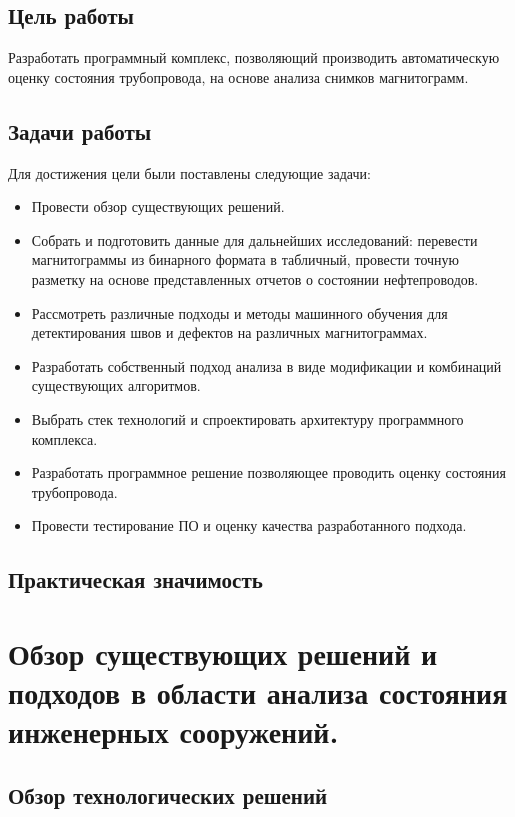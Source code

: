 \documentclass[a4paper,article,14pt]{extarticle}
\begin{document}
\subsection{Цель работы}
Разработать программный комплекс, позволяющий производить автоматическую оценку состояния трубопровода, на основе анализа снимков магнитограмм. 

\subsection{Задачи работы}
Для достижения цели были поставлены следующие задачи:

\begin{itemize}
    \item Провести обзор существующих решений.
    \item Собрать и подготовить данные для дальнейших исследований: перевести магнитограммы из бинарного формата в табличный, 
    провести точную разметку на основе представленных отчетов о состоянии нефтепроводов.
    \item Рассмотреть различные подходы и методы машинного обучения для детектирования швов и дефектов на различных магнитограммах.
    \item Разработать собственный подход анализа в виде модификации и комбинаций существующих алгоритмов.
    \item Выбрать стек технологий и спроектировать архитектуру программного комплекса.
    \item Разработать программное решение позволяющее проводить оценку состояния трубопровода.
    \item Провести тестирование ПО и оценку качества разработанного подхода.
\end{itemize}

\subsection{Практическая значимость}

\section{Обзор существующих решений и подходов в области анализа состояния инженерных сооружений.}

\subsection{Обзор технологических решений}
\end{document}
